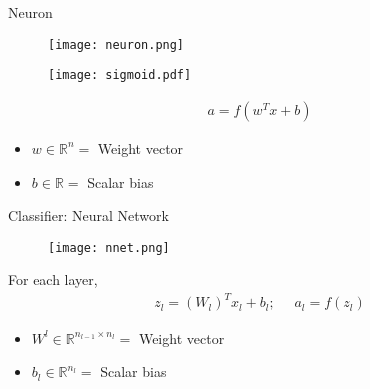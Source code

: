 \begin{frame}{Neuron}

	\begin{figure}[!tbp]
	\begin{minipage}[b]{0.4\textwidth}
    	\texttt{[image: neuron.png]}
  	\end{minipage}
  	\begin{minipage}[b]{0.4\textwidth}
    	\texttt{[image: sigmoid.pdf]}
  	\end{minipage}
	\end{figure}
	
	\begin{align*}
	a = f(w^T x + b)
	\end{align*}
	
	\begin{itemize}
	\item $w \in \mathbb{R}^n = $ Weight vector
	\item $b \in \mathbb{R} = $ Scalar bias
	\end{itemize} 

\end{frame}

\begin{frame}{Classifier: Neural Network}

	\begin{figure}[!tbp]
	  \centering
	    \texttt{[image: nnet.png]}
	\end{figure}
	
	For each layer,
	\begin{align*}
	z_l = (W_l)^T x_l + b_l; \hspace{16pt}
	a_l = f(z_l)
	\end{align*}
	
	\begin{itemize}
	\item $W^l \in \mathbb{R}^{n_{l-1} \times n_l} = $ Weight vector
	\item $b_l \in \mathbb{R}^{n_l} = $ Scalar bias
	\end{itemize} 

\end{frame}